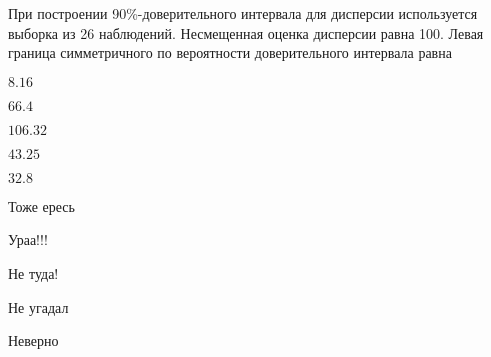 
\begin{question}
При построении 90\%-доверительного интервала для дисперсии используется
выборка из 26 наблюдений. Несмещенная оценка дисперсии равна 100. Левая
граница симметричного по вероятности доверительного интервала равна
\begin{answerlist}
  \item \(8.16\)
  \item \(66.4\)
  \item \(106.32\)
  \item \(43.25\)
  \item \(32.8\)
\end{answerlist}
\end{question}

\begin{solution}
\begin{answerlist}
  \item Тоже ересь
  \item Ураа!!!
  \item Не туда!
  \item Не угадал
  \item Неверно
\end{answerlist}
\end{solution}

